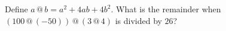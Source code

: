 Define $a\,@\,b=a^2+4ab+4b^2$. What is the remainder when $(100\,@\,(-50))\,@\,(3\,@\,4)$ is divided by $26$?
